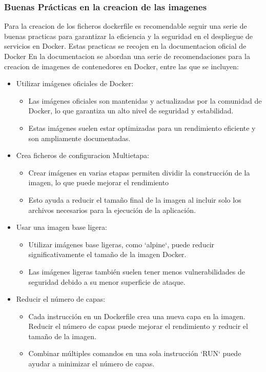 \documentclass[12pt, a4paper, twoside]{article}
\begin{document}
\subsubsection{Buenas Prácticas en la creacion de las imagenes}
Para la creacion de los ficheros dockerfile es recomendable seguir una serie de buenas practicas para garantizar la eficiencia y la seguridad en el despliegue de servicios en Docker.
Estas practicas se recojen en la documentacion oficial de Docker \cite{dockerfile_best_practices}
En la documentacion se abordan una serie de recomendaciones para la creacion de imagenes de contenedores en Docker, entre las que se incluyen:
\begin{itemize}
    \item Utilizar imágenes oficiales de Docker:
    \begin{itemize}
        \item Las imágenes oficiales son mantenidas y actualizadas por la comunidad de Docker, lo que garantiza un alto nivel de seguridad y estabilidad.
        \item Estas imágenes suelen estar optimizadas para un rendimiento eficiente y son ampliamente documentadas.
    \end{itemize}
    
    \item Crea ficheros de configuracion Multietapa:
    \begin{itemize}
        \item Crear imágenes en varias etapas permiten dividir la construcción de la imagen, lo que puede mejorar el rendimiento
        \item Esto ayuda a reducir el tamaño final de la imagen al incluir solo los archivos necesarios para la ejecución de la aplicación.
    \end{itemize}
    
    \item Usar una imagen base ligera:
    \begin{itemize}
        \item Utilizar imágenes base ligeras, como `alpine`, puede reducir significativamente el tamaño de la imagen Docker.
        \item Las imágenes ligeras también suelen tener menos vulnerabilidades de seguridad debido a su menor superficie de ataque.
    \end{itemize}
    
    \item Reducir el número de capas:
    \begin{itemize}
        \item Cada instrucción en un Dockerfile crea una nueva capa en la imagen. Reducir el número de capas puede mejorar el rendimiento y reducir el tamaño de la imagen.
        \item Combinar múltiples comandos en una sola instrucción `RUN` puede ayudar a minimizar el número de capas.
    \end{itemize}
    

\end{itemize}
\end{document}
